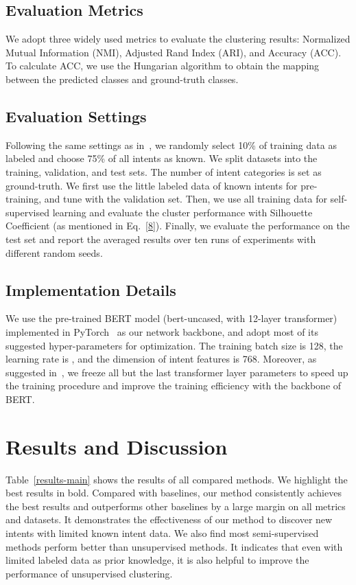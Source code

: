 \documentclass[letterpaper]{article} \usepackage{aaai21}  \usepackage{times}  \usepackage{helvet} \usepackage{courier}  \usepackage[hyphens]{url}  \usepackage{graphicx} \urlstyle{rm} \def\UrlFont{\rm}  \usepackage{natbib}  \usepackage{caption} \frenchspacing  \setlength{\pdfpagewidth}{8.5in}  \setlength{\pdfpageheight}{11in}  \usepackage{amsmath}
\begin{document}
	\subsection{Evaluation Metrics}
	We adopt three widely used metrics to evaluate the clustering results: Normalized Mutual Information (NMI), Adjusted Rand Index (ARI), and Accuracy (ACC). To calculate ACC, we use the Hungarian algorithm to obtain the mapping between the predicted classes and ground-truth classes.
	
	\subsection{Evaluation Settings}
	Following the same settings as in~\cite{lin2020discovering}, we randomly select 10\% of training data as labeled and choose 75\% of all intents as known. We split datasets into the training, validation, and test sets. The number of intent categories is set as ground-truth. We first use the little labeled data of known intents for pre-training, and tune with the validation set. Then, we use all training data for self-supervised learning and evaluate the cluster performance with Silhouette Coefficient (as mentioned in Eq.~\ref{8}). Finally, we evaluate the performance on the test set and report the averaged results over ten runs of experiments with different random seeds.
	\subsection{Implementation Details}
	We use the pre-trained BERT model (bert-uncased, with 12-layer transformer) implemented in PyTorch~\cite{Wolf2019HuggingFacesTS} as our network backbone, and adopt most of its suggested hyper-parameters for optimization. The training batch size is 128, the learning rate is , and the dimension of intent features  is 768. Moreover, as suggested in~\cite{lin2020discovering},  we freeze all but the last transformer layer parameters to speed up the training procedure and improve the training efficiency with the backbone of BERT. 
	
	
	
	\section{Results and Discussion}
	Table~\ref{results-main} shows the results of all compared methods. We highlight the best results in bold. Compared with baselines, our method consistently achieves the best results and outperforms other baselines by a large margin on all metrics and datasets. It demonstrates the effectiveness of our method to discover new intents with limited known intent data. We also find most semi-supervised methods perform better than unsupervised methods. It indicates that even with limited labeled data as prior knowledge, it is also helpful to improve the performance of unsupervised clustering.
	
\end{document}

